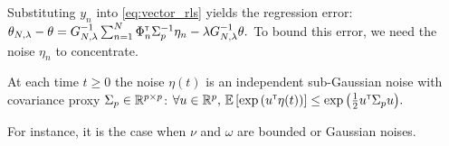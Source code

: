 \documentclass{article}
\begin{document}
Substituting $y_n$ into \eqref{eq:vector_rls} yields the regression error:
$
    \theta_{N,\lambda} - \theta = G_{N, \lambda}^{-1}\sum_{n=1}^N \Phi_n^{\mathsf{\scriptscriptstyle T}} \Sigma_p^{-1}\eta_n - \lambda G_{N, \lambda}^{-1}\theta.
$
To bound this error, we need the noise $\eta_n$ to concentrate.
%
%
%
%
%

\begin{assumption}
\label{assumpt:gaussian-noise}
At each time $t\geq0$ the noise $\eta(t)$ is an independent sub-Gaussian noise with covariance proxy $\Sigma_p \in \mathbb{R}^{p\times p}$:
$
    \forall u\in\mathbb{R}^p,\, \operatorname*{\mathbb{E}} \left[ \exp{\left( u^{\mathsf{\scriptscriptstyle T}}\eta(t)\right)}\right] \leq \exp{\left( \frac{1}{2} u^{\mathsf{\scriptscriptstyle T}}\Sigma_p u\right)}.
$
\end{assumption}
For instance, it is the case when $\nu$ and $\omega$ are bounded or Gaussian noises.
\end{document}
